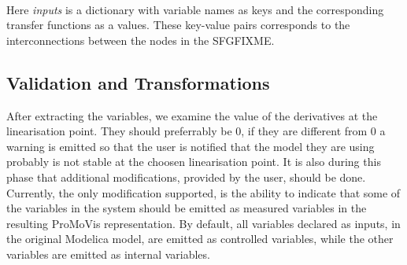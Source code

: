\setlength\fboxsep{0pt}
\setlength\fboxrule{0.5pt}
\\\newline Here \textit{inputs} is a dictionary with variable names as keys and the corresponding transfer functions as a values. These key-value pairs corresponds to the interconnections between the nodes in the SFGFIXME. 




\subsection{Validation and Transformations}
After extracting the variables, we examine the value of the derivatives at the linearisation point. They should preferrably be 0, if they are different from 0 a warning is emitted so that the user is notified that the model they are using probably is not stable at the choosen linearisation point. It is also during this phase that additional modifications, provided by the user, should be done. Currently, the only modification supported, is the ability to indicate that some of the variables in the system should be emitted as measured variables in the resulting ProMoVis representation. By default, all variables declared as inputs, in the original Modelica model,  are emitted as controlled variables, while the other variables are emitted as internal variables.
